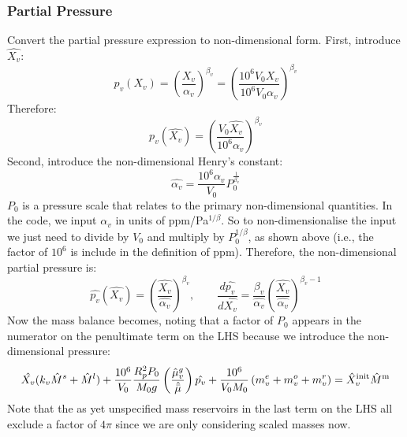 \subsubsection{Partial Pressure}
Convert the partial pressure expression to non-dimensional form.  First, introduce $\hat{X_v}$:
\begin{equation}
p_v( X_v ) = \left( \frac{X_v}{\alpha_v} \right)^{\beta_v}
 = \left( \frac{10^6 V_0 X_v}{10^6 V_0 \alpha_v} \right)^{\beta_v}
 \end{equation}
Therefore:
\begin{equation}
p_v( \hat{X_v} ) = \left( \frac{V_0 \hat{X_v}}{10^6 \alpha_v} \right)^{\beta_v}
\end{equation}
Second, introduce the non-dimensional Henry's constant:
\begin{equation}
\hat{\alpha_v} = \frac{10^6 \alpha_v}{V_0} P_0^\frac{1}{\beta_v}
\end{equation}
$P_0$ is a pressure scale that relates to the primary non-dimensional quantities.  In the code, we input $\alpha_v$ in units of ppm/Pa$^{1/\beta}$.  So to non-dimensionalise the input we just need to divide by $V_0$ and multiply by $P_0^{1/\beta}$, as shown above (i.e., the factor of $10^6$ is include in the definition of ppm).  Therefore, the non-dimensional partial pressure is:
\begin{equation}
\hat{p_v} ( \hat{X_v} ) = \left( \frac{\hat{X_v}}{\hat{\alpha_v}} \right) ^ {\beta_v}, \qquad \frac{d \hat{p_v}}{d \hat{X_v}} = \frac{\beta_v}{\hat{\alpha_v}} \left( \frac{\hat{X_v}}{\hat{\alpha_v}} \right)^{\beta_v-1}
\end{equation}
Now the mass balance becomes, noting that a factor of $P_0$ appears in the numerator on the penultimate term on the LHS because we introduce the non-dimensional pressure:
\begin{equation}
\hat{X_v} (k_v \hat{M}^s + \hat{M}^l) + \frac{10^6}{V_0} \frac{R_p^2 P_0}{M_0 g} \left( \frac{\hat{\mu}_v^g}{\hat{\bar{\mu}}} \right) \hat{p_v} + \frac{10^6}{V_0 M_0} \left( m_v^e + m_v^o + m_v^r \right) = \hat{X}_v^{\rm init} \hat{M}^{\rm m}
\end{equation}
Note that the as yet unspecified mass reservoirs in the last term on the LHS all exclude a factor of $4\pi$ since we are only considering scaled masses now.
